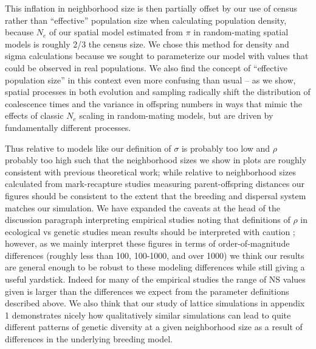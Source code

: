 {This inflation in neighborhood size is then partially offset by our use of census rather than ``effective'' population size when calculating population density, because $N_e$ of our spatial model estimated from $\pi$ in random-mating spatial models is roughly 2/3 the census size. We chose this method for density and sigma calculations because we sought to parameterize our model with values that could be observed in real populations. We also find the concept of ``effective population size'' in this context even more confusing than usual -- as we show, spatial processes in both evolution and sampling radically shift the distribution of coalescence times and the variance in offspring numbers in ways that mimic the effects of classic $N_{e}$ scaling in random-mating models, but are driven by fundamentally different processes.

Thus relative to models like \cite{Rousset1997} our definition of $\sigma$ is probably too low and $\rho$ probably too high such that the neighborhood sizes we show in plots are roughly consistent with previous theoretical work; while relative to neighborhood sizes calculated from mark-recapture studies measuring parent-offspring distances our figures should be consistent to the extent that the breeding and dispersal system matches our simulation. We have expanded the caveats at the head of the discussion paragraph interpreting empirical studies noting that definitions of $\rho$ in ecological vs genetic studies mean results should be interpreted with caution ; however, as we mainly interpret these figures in terms of order-of-magnitude differences (roughly less than 100, 100-1000, and over 1000) we think our results are general enough to be robust to these modeling differences while still giving a useful yardstick. Indeed for many of the empirical studies the range of NS values given is larger than the differences we expect from the parameter definitions described above. We also think that our study of lattice simulations in appendix 1 demonstrates nicely how qualitatively similar simulations can lead to quite different patterns of genetic diversity at a given neighborhood size as a result of differences in the underlying breeding model. 


}


